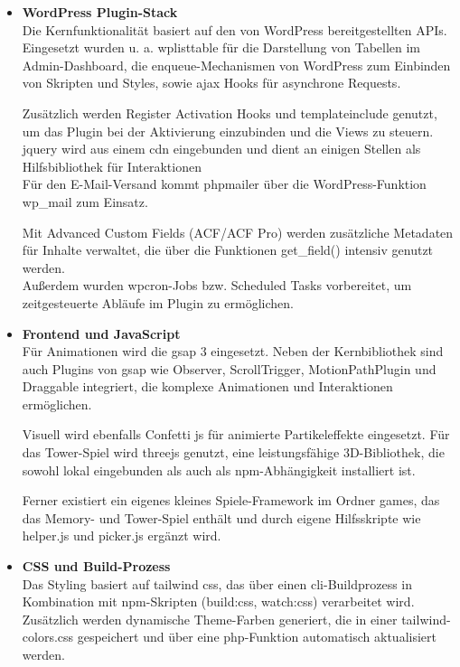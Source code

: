 \begin{itemize}
    \item \textbf{WordPress Plugin-Stack}\\
    Die Kernfunktionalität basiert auf den von WordPress bereitgestellten APIs. %
    Eingesetzt wurden u. a. \gls{wplisttable} für die Darstellung von Tabellen im Admin-Dashboard, die \gls{enqueue}-Mechanismen von WordPress zum Einbinden von Skripten und Styles, sowie \gls{ajax} Hooks für asynchrone Requests.

    Zusätzlich werden Register Activation Hooks und \gls{templateinclude} genutzt, um das Plugin bei der Aktivierung einzubinden und die Views zu steuern.\\
    \gls{jquery} wird aus einem \gls{cdn} eingebunden und dient an einigen Stellen als Hilfsbibliothek für Interaktionen\\
    Für den E-Mail-Versand kommt \gls{phpmailer} über die WordPress-Funktion wp\_mail zum Einsatz.

    Mit Advanced Custom Fields (ACF/ACF Pro) werden zusätzliche Metadaten für Inhalte verwaltet, die über die Funktionen get\_field() intensiv genutzt werden.\\
    Außerdem wurden \gls{wpcron}-Jobs bzw. Scheduled Tasks vorbereitet, um zeitgesteuerte Abläufe im Plugin zu ermöglichen.

    \item \textbf{Frontend und JavaScript}\\
    Für Animationen wird die \gls{gsap} 3 eingesetzt.
    Neben der Kernbibliothek sind auch Plugins von \gls{gsap} wie Observer, ScrollTrigger, MotionPathPlugin und Draggable integriert, die komplexe Animationen und Interaktionen ermöglichen.

    Visuell wird ebenfalls Confetti \gls{js} für animierte Partikeleffekte eingesetzt.
    Für das Tower-Spiel wird \gls{threejs} genutzt, eine leistungsfähige 3D-Bibliothek, die sowohl lokal eingebunden als auch als \gls{npm}-Abhängigkeit installiert ist.

    Ferner existiert ein eigenes kleines Spiele-Framework im Ordner \grqq{}games\grqq{}, das das Memory- und Tower-Spiel enthält und durch eigene Hilfsskripte wie helper.js und picker.js ergänzt wird.

    \item \textbf{CSS und Build-Prozess}\\
    Das Styling basiert auf \gls{tailwind} \gls{css}, das über einen \gls{cli}-Buildprozess in Kombination mit \gls{npm}-Skripten (build:css, watch:css) verarbeitet wird.
    Zusätzlich werden dynamische Theme-Farben generiert, die in einer tailwind-colors.css gespeichert und über eine \gls{php}-Funktion automatisch aktualisiert werden.


\end{itemize}
